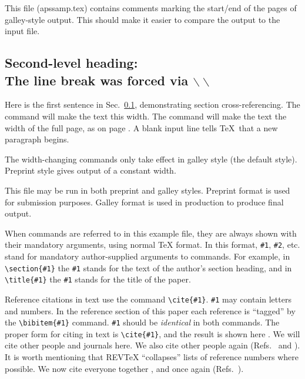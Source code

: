 This file (apssamp.tex) contains comments marking the start/end of the
pages of galley-style output. This should make it easier to compare the
output to the input file.

\subsection{Second-level heading:\protect\\ The line break was forced via
$\backslash\backslash$}
\label{sec:level2}

Here is the first sentence in Sec.\ \ref{sec:level2}, demonstrating
section cross-referencing.
The command 
will make the text this width. The command 
will make the text the width of the full page, as on page \pageref{wideeq}.
A blank input line tells \TeX\ that a new paragraph begins.

The width-changing commands only take effect in galley style (the default
style). Preprint style gives output of a constant width.

This file may be run in both preprint and galley styles. Preprint
format is used for submission purposes. Galley format is used in production
to produce final output.

When commands are referred to in this example file, they are always shown
with their mandatory arguments, using normal \TeX{} format. In this format,
\verb+#1+, \verb+#2+, etc. stand for mandatory
author-supplied arguments to commands.
For example, in
\verb+\section{#1}+ the \verb+#1+ stands for the text of the author's section
heading, and in \verb+\title{#1}+ the \verb+#1+ stands for the
title of the paper.


Reference citations in text use the command \verb+\cite{#1}+.
\verb+#1+ may contain letters and numbers.
In the reference section of this paper
each reference is ``tagged'' by the \verb+\bibitem{#1}+ command.
\verb+#1+ should be {\em identical\/} in both commands.
The proper form for citing in text is
\verb+\cite{#1}+,
and the result is shown here \cite{smith82,jones78}.
We will cite  other people \cite{smith82,jonessmith80}
and journals here. We also cite other people again (Refs.\
 and ).
It is worth mentioning that REV\TeX{} ``collapses'' lists
of reference numbers where possible.  We now cite
everyone together \cite{smith82,jones78,jonessmith80}, and once again
(Refs.\ \onlinecite{smith82,jones78,jonessmith80}).

